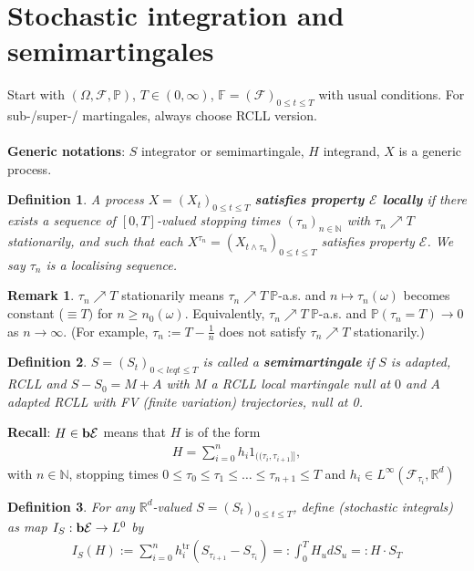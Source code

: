 \documentclass[12pt,a4paper, twoside]{article}
\newtheorem{defn}{Definition}[section]
\theoremstyle{definition}
\newtheorem{rem}{Remark}[section]
\newcommand{\PP}{\mathbb{P}} %
\newcommand{\simple}{\textbf{\text{b}}\mathcal{E}}
\begin{document}
\section{Stochastic integration and semimartingales}
Start with $( \Omega, \mathcal{F}, \PP)$, $T \in (0, \infty)$, $\mathbb{F}=(\mathcal{F})_{0 \leq t \leq T}$ with usual conditions. For sub-/super-/ martingales, always choose RCLL version. 
\\\\
\textbf{Generic notations}: $S$ integrator or semimartingale, $H$ integrand, $X$ is a generic process. 
\begin{defn} A process $X=(X_t)_{0 \leq t \leq T}$ \textbf{satisfies property $\mathcal{E}$ locally} if there exists a sequence of $[0,T]$-valued stopping times $( \tau_n)_{n \in \mathbb{N}}$ with $\tau_n \nearrow T$ stationarily, and such that each $X^{\tau_n}= (X_{t \wedge \tau_n})_{0 \leq t \leq T}$ satisfies property $\mathcal{E}$. We say $\tau_n$ is a localising sequence. 
\end{defn}
\begin{rem} $\tau_n \nearrow T$ stationarily means $\tau_n \nearrow T \ \PP$-a.s. and $n \mapsto \tau_n( \omega)$ becomes constant ($\equiv T)$ for $n \geq n_0( \omega)$. Equivalently, $\tau_n \nearrow T \ \PP$-a.s. and $\PP( \tau_n=T) \to 0$ as $n \to \infty$. (For example, $\tau_n := T- \frac{1}{n}$ does not satisfy $\tau_n \nearrow T$ stationarily.) 
\end{rem}
\begin{defn} $S=(S_t)_{0 <leq t \leq T}$ is called a \textbf{semimartingale} if $S$ is adapted, RCLL and $S-S_0=M+A$ with $M$ a RCLL local martingale null at $0$ and $A$ adapted RCLL with FV (finite variation) trajectories, null at 0. 
\end{defn}
\textbf{Recall}: $H \in \simple$ means that $H$ is of the form 
\begin{align*}
H = \sum_{i=0}^n h_i 1_{(\!( \tau_i, \tau_{i+1} ]\!]},
\end{align*}
with $n \in \mathbb{N}$,  stopping times $0 \leq \tau_0 \leq \tau_1 \leq \dots \leq \tau_{n+1} \leq T$ and $h_i \in L^\infty ( \mathcal{F}_{\tau_i}, \mathbb{R}^d)$
\begin{defn} For any $\mathbb{R}^d$-valued $S= (S_t)_{0 \leq t \leq T}$, define (stochastic integrals) as map $I_S: \simple \to L^0$ by
\begin{align*}
I_S(H):= \sum_{i=0}^n h_i^\text{tr} (S_{\tau_{i+1}}-S_{\tau_i}) =: \int_0^T H_u dS_u =: H \cdot S_T
\end{align*} 
\end{defn}
\end{document}
